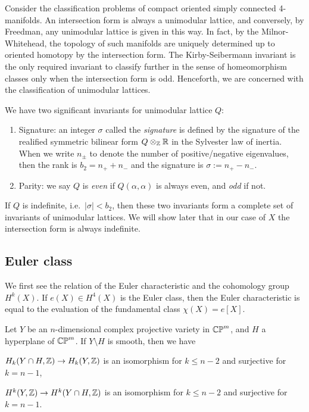\documentclass{../../../small}
\begin{document}
Consider the classification problems of compact oriented simply connected 4-manifolds.
An intersection form is always a unimodular lattice, and conversely, by Freedman, any unimodular lattice is given in this way.
In fact, by the Milnor-Whitehead, the topology of such manifolds are uniquely determined up to oriented homotopy by the intersection form.
The Kirby-Seibermann invariant is the only required invariant to classify further in the sense of homeomorphism classes only when the intersection form is odd.
Henceforth, we are concerned with the classification of unimodular lattices.

We have two significant invariants for unimodular lattice $Q$:
\begin{enumerate}[(1)]
\item Signature: an integer $\sigma$ called the \emph{signature} is defined by the signature of the realified symmetric bilinear form $Q\otimes_{\mathbb{Z}}\mathbb{R}$ in the Sylvester law of inertia.
When we write $n_{\pm}$ to denote the number of positive/negative eigenvalues, then the rank is $b_2=n_++n_-$ and the signature is $\sigma:=n_+-n_-$.
\item Parity: we say $Q$ is \emph{even} if $Q(\alpha,\alpha)$ is always even, and \emph{odd} if not.
\end{enumerate}
If $Q$ is indefinite, i.e.~$|\sigma|<b_2$, then these two invariants form a complete set of invariants of unimodular lattices.
We will show later that in our case of $X$ the intersection form is always indefinite.

\subsection{Euler class}
We first see the relation of the Euler characteristic and the cohomology group $H^k(X)$.
If $e(X)\in H^4(X)$ is the Euler class, then the Euler characteristic is equal to the evaluation of the fundamental class $\chi(X)=e[X]$.

\begin{thm}
Let $Y$ be an $n$-dimensional complex projective variety in $\mathbb{CP}^m$, and $H$ a hyperplane of $\mathbb{CP}^m$.
If $Y\setminus H$ is smooth, then we have
\begin{parts}
\item $H_k(Y\cap H,\mathbb{Z})\to H_k(Y,\mathbb{Z})$ is an isomorphism for $k\le n-2$ and surjective for $k=n-1$,
\item $H^k(Y,\mathbb{Z})\to H^k(Y\cap H,\mathbb{Z})$ is an isomorphism for $k\le n-2$ and surjective for $k=n-1$.
\end{parts}
\end{thm}
\end{document}
